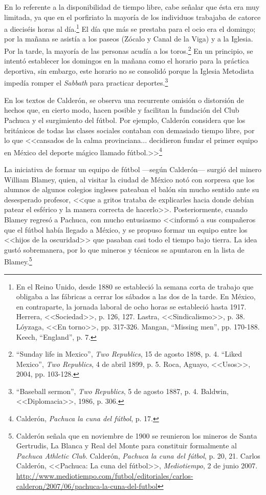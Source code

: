 \documentclass[11pt,a5paper,twoside]{book} %
\begin{document}
En lo referente a la disponibilidad de tiempo libre, cabe señalar que ésta era muy
limitada, ya que en el porfiriato la mayoría de los individuos trabajaba de catorce a dieciséis
horas al día.\footnote{En el Reino Unido, desde 1880 se estableció la semana corta de trabajo que obligaba a las fábricas a cerrar los sábados a las dos de la tarde. En México, en contraparte, la jornada laboral de ocho horas se estableció hasta 1917. Herrera, <<Sociedad>>, p. 126, 127. Lastra, <<Sindicalismo>>, p. 38. Lóyzaga, <<En torno>>, pp. 317-326. Mangan, ``Missing men'', pp. 170-188. Keech, ``England'', p. 7.} El día que más se prestaba para el ocio era el domingo; por la mañana se
asistía a los paseos (Zócalo y Canal de la Viga) y a la Iglesia. Por la tarde, la mayoría de las
personas acudía a los toros.\footnote{``Sunday life in Mexico'', \emph{Two Republics}, 15 de agosto 1898, p. 4. ``Liked Mexico'', \emph{Two Republics}, 4 de abril 1899, p. 5. Roca, Aguayo, <<Usos>>, 2004, pp. 103-128.} En un principio, se intentó establecer los domingos en la
mañana como el horario para la práctica deportiva, sin embargo, este horario no se consolidó
porque la Iglesia Metodista impedía romper el \emph{Sabbath} para practicar deportes.\footnote{``Baseball sermon'', \emph{Two Republics}, 5 de agosto 1887, p. 4. Baldwin, <<Diplomacia>>, 1986, p. 306.}

En los textos de Calderón, se observa una recurrente omisión o distorsión de hechos
que, en cierto modo, hacen posible y facilitan la fundación del Club Pachuca y el surgimiento
del fútbol. Por ejemplo, Calderón considera que los británicos de todas las clases sociales
contaban con demasiado tiempo libre, por lo que <<cansados de la calma provinciana... decidieron fundar el primer equipo en México del deporte mágico llamado fútbol.>>\footnote{Calderón, \emph{Pachuca la cuna del fútbol}, p. 17.}

La iniciativa de formar un equipo de fútbol ---según Calderón--- surgió del minero
William Blamey, quien, al visitar la ciudad de México notó con sorpresa que los alumnos de
algunos colegios ingleses pateaban el balón sin mucho sentido ante su desesperado profesor, <<que a gritos trataba de explicarles hacia donde debían patear el esférico y la manera correcta de hacerlo>>. Posteriormente, cuando Blamey regresó a Pachuca, con mucho entusiasmo <<informó a sus compañeros que el fútbol había llegado a México, y se propuso formar un equipo entre los <<hijos de la oscuridad>> que pasaban casi todo el tiempo bajo tierra. La idea gustó sobremanera, por lo que mineros y técnicos se apuntaron en la lista de Blamey.\footnote{Calderón señala que en noviembre de 1900 se reunieron los mineros de Santa Gertrudis, La Blanca y Real del Monte para constituir formalmente al \emph{Pachuca Athletic Club}. Calderón, \emph{Pachuca la cuna del fútbol}, p. 20,
21. Carlos Calderón, <<Pachuca: La cuna del fútbol>>, \emph{Mediotiempo}, 2 de junio 2007. \url{http://www.mediotiempo.com/futbol/editoriales/carlos-calderon/2007/06/pachuca-la-cuna-del-futbol}}
\end{document}
